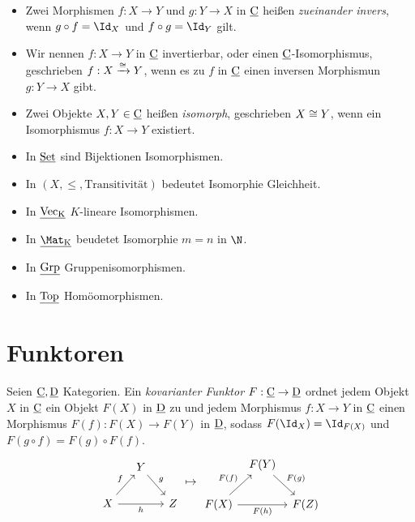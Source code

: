 \begin{df}
	\begin{itemize}
		\item
			Zwei Morphismen $f: X \to Y$ und $g: Y \to X$ in $\underline{\mathrm{C}}$ heißen \emph{zueinander invers}, wenn $g \circ f = \Id_X$ und $f \circ g = \Id_Y$ gilt.
		\item
			Wir nennen $f: X \to Y$ in $\underline{\mathrm{C}}$ invertierbar, oder einen $\underline{\mathrm{C}}$-Isomorphismus, geschrieben $f: X \xrightarrow{\cong} Y$, wenn es zu $f$ in $\underline{\mathrm{C}}$ einen inversen Morphismun $g: Y \to X$ gibt.
		\item
			Zwei Objekte $X, Y \in \underline{\mathrm{C}}$ heißen \emph{isomorph}, geschrieben $X \cong Y$, wenn ein Isomorphismus $f: X \to Y$ existiert.
	\end{itemize}
\end{df}

\begin{ex}
	\begin{itemize}
		\item
			In $\underline{\mathrm{Set}}$ sind Bijektionen Isomorphismen.
		\item
			In $(X, \le, \text{Transitivität})$ bedeutet Isomorphie Gleichheit.
		\item
			In $\underline{\mathrm{\operatorname{Vec}_K}}$ $K$-lineare Isomorphismen.
		\item
			In $\Cat{\Mat_K}$ beudetet Isomorphie $m = n$ in $\N$.
		\item
			In $\underline{\mathrm{Grp}}$ Gruppenisomorphismen.
		\item
			In $\underline{\mathrm{Top}}$ Homöomorphismen.
	\end{itemize}
\end{ex}


\section{Funktoren}


\begin{df}
	Seien $\underline{\mathrm{C}}, \underline{\mathrm{D}}$ Kategorien.
	Ein \emph{kovarianter Funktor} $F: \underline{\mathrm{C}} \to \underline{\mathrm{D}}$ ordnet jedem Objekt $X$ in $\underline{\mathrm{C}}$ ein Objekt $F(X)$ in $\underline{\mathrm{D}}$ zu und jedem Morphismus $f: X \to Y$ in $\underline{\mathrm{C}}$ einen Morphismus $F(f) : F(X) \to F(Y)$ in $\underline{\mathrm{D}}$, sodass $F(\Id_X) = \Id_{F(X)}$ und $F(g\circ f) = F(g) \circ F(f)$.
	\[
		\begin{tikzcd}[column sep=small]
			~ & Y \arrow{dr}{g} & \\
			X \arrow{ur}{f} \arrow{rr}[swap]{h} & & Z
		\end{tikzcd}
		\mapsto
		\begin{tikzcd}[column sep=tiny]
			~ & F(Y) \arrow{dr}{F(g)} & \\
			F(X) \arrow{ur}{F(f)} \arrow{rr}[swap]{F(h)} & & F(Z)
		\end{tikzcd}
	\]
\end{df}

